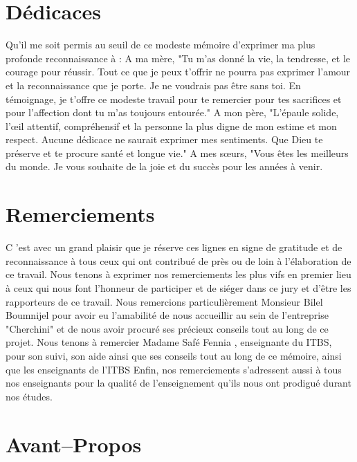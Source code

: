 \chapter*{D\'{e}dicaces}
Qu'il me soit permis au seuil de ce modeste m\'{e}moire d'exprimer ma plus profonde
reconnaissance \`{a} : A ma m\`{e}re,
"Tu m'as donn\'{e} la vie, la tendresse, et le courage pour r\'{e}ussir. Tout ce que je peux t'offrir ne pourra
pas exprimer l'amour et la reconnaissance que je porte. Je ne voudrais pas \^{e}tre sans toi.
En t\'{e}moignage, je t'offre ce modeste travail pour te remercier pour tes sacrifices et pour l'affection
dont tu m'as toujours entour\'{e}e."
A mon p\`{e}re,
"L'\'{e}paule solide, l'\oe{}il attentif, compr\'{e}hensif et la personne la plus digne de mon estime et mon
respect. Aucune d\'{e}dicace ne saurait exprimer mes sentiments. Que Dieu te pr\'{e}serve et te procure
sant\'{e} et longue vie."
A mes s\oe{}urs,
"Vous \^{e}tes les meilleurs du monde. Je vous souhaite de la joie et du succ\`{e}s pour les ann\'{e}es \`{a} venir.


\chapter*{Remerciements}
C 'est avec un grand plaisir que je r\'{e}serve ces lignes en signe de gratitude et de reconnaissance \`{a}
tous ceux qui ont contribu\'{e} de pr\`{e}s ou de loin \`{a} l'\'{e}laboration de ce travail.
Nous tenons \`{a} exprimer nos remerciements les plus vifs en premier lieu \`{a} ceux qui nous font
l'honneur de participer et de si\'{e}ger dans ce jury et d'\^{e}tre les rapporteurs de ce travail.
Nous remercions particuli\`{e}rement Monsieur Bilel Boumnijel pour avoir eu l'amabilit\'{e} de nous
accueillir au sein de l'entreprise "Cherchini" et de nous avoir procur\'{e} ses pr\'{e}cieux conseils tout au
long de ce projet.
Nous tenons \`{a} remercier Madame Saf\'{e} Fennia , enseignante du ITBS, pour son suivi, son aide
ainsi que ses conseils tout au long de ce m\'{e}moire, ainsi que les enseignants de l'ITBS
Enfin, nos remerciements s'adressent aussi \`{a} tous nos enseignants pour la qualit\'{e} de l'enseignement
qu'ils nous ont prodigu\'{e} durant nos \'{e}tudes.

\chapter*{Avant–Propos}

